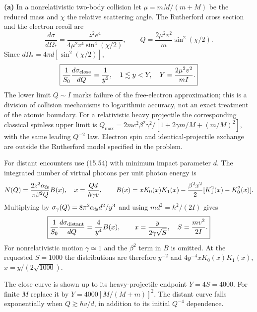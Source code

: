 \medskip\noindent\textbf{(a)} In a nonrelativistic two-body collision
let $\mu=mM/(m+M)$ be the reduced mass and $\chi$ the relative
scattering angle.  The Rutherford cross section and the electron
recoil are
\[
\frac{d\sigma}{d\Omega_*}
=\frac{z^2e^4}{4\mu^2v^4\sin^4(\chi/2)},\qquad
Q=\frac{2\mu^2v^2}{m}\sin^2(\chi/2).
\]
Since $d\Omega_*=4\pi d[\sin^2(\chi/2)]$,
\[
\boxed{\frac1{S_0}\frac{d\sigma_{\rm close}}{dQ}
=\frac1{y^2},\quad 1\lesssim y<Y,
\quad Y=\frac{2\mu^2v^2}{mI}.}
\]
The lower limit $Q\sim I$ marks failure of the free-electron
approximation; this is a division of collision mechanisms to
logarithmic accuracy, not an exact treatment of the atomic boundary.
For a relativistic heavy projectile the corresponding classical
spinless upper limit is
$Q_{\max}=2mc^2\beta^2\gamma^2/
[1+2\gamma m/M+(m/M)^2]$, with the same leading $Q^{-2}$ law.
Electron spin and identical-projectile exchange are outside the
Rutherford model specified in the problem.

For distant encounters use (15.54) with minimum impact parameter
$d$.  The integrated number of virtual photons per unit photon
energy is
\[
N(Q)=\frac{2z^2\alpha_{\rm fs}}{\pi\beta^2Q}B(x),
\quad x=\frac{Qd}{\hbar\gamma v},\qquad
B(x)=xK_0(x)K_1(x)-\frac{\beta^2x^2}{2}[K_1^2(x)-K_0^2(x)].
\]
Multiplying by $\sigma_\gamma(Q)=8\pi^2\alpha_{\rm fs}d^2/y^3$
and using $md^2=\hbar^2/(2I)$ gives
\[
\boxed{\frac1{S_0}\frac{d\sigma_{\rm distant}}{dQ}
=\frac4{y^4}B(x),\qquad
x=\frac{y}{2\gamma\sqrt{S}},\quad S=\frac{mv^2}{2I}.}
\]
For nonrelativistic motion $\gamma\simeq1$ and the $\beta^2$
term in $B$ is omitted.  At the requested $S=1000$ the distributions
are therefore $y^{-2}$ and
$4y^{-4}xK_0(x)K_1(x)$, $x=y/(2\sqrt{1000})$.
\begin{center}\end{center}
The close curve is shown up to its heavy-projectile endpoint
$Y=4S=4000$.  For finite $M$ replace it by
$Y=4000[M/(M+m)]^2$.  The distant curve falls exponentially when
$Q\gtrsim\hbar v/d$, in addition to its initial $Q^{-4}$ dependence.

